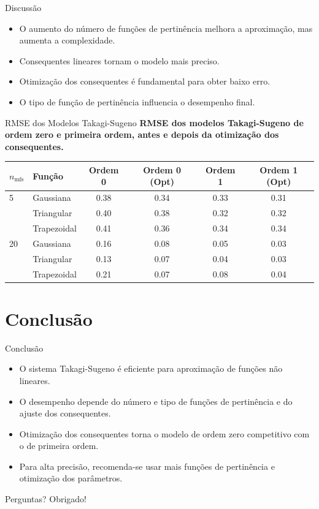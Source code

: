 \documentclass[aspectratio=169]{beamer}
\begin{document}
\begin{frame}{Discussão}
    \begin{itemize}
        \item O aumento do número de funções de pertinência melhora a aproximação, mas aumenta a complexidade.
        \item Consequentes lineares tornam o modelo mais preciso.
        \item Otimização dos consequentes é fundamental para obter baixo erro.
        \item O tipo de função de pertinência influencia o desempenho final.
    \end{itemize}
\end{frame}

\begin{frame}{RMSE dos Modelos Takagi-Sugeno}
    \centering
    \scriptsize
    \textbf{RMSE dos modelos Takagi-Sugeno de ordem zero e primeira ordem, antes e depois da otimização dos consequentes.}
    \vspace{0.5em}
    \begin{tabular}{llcccc}
        \toprule
        $n_\text{mfs}$ & Função & Ordem 0 & Ordem 0 (Opt) & Ordem 1 & Ordem 1 (Opt) \\
        \midrule
        5  & Gaussiana   & 0.38 & 0.34 & 0.33 & 0.31 \\
           & Triangular  & 0.40 & 0.38 & 0.32 & 0.32 \\
           & Trapezoidal & 0.41 & 0.36 & 0.34 & 0.34 \\
        \midrule
        20 & Gaussiana   & 0.16 & 0.08 & 0.05 & 0.03 \\
           & Triangular  & 0.13 & 0.07 & 0.04 & 0.03 \\
           & Trapezoidal & 0.21 & 0.07 & 0.08 & 0.04 \\
        \bottomrule
    \end{tabular}
\end{frame}

\section{Conclusão}

\begin{frame}{Conclusão}
    \begin{itemize}
        \item O sistema Takagi-Sugeno é eficiente para aproximação de funções não lineares.
        \item O desempenho depende do número e tipo de funções de pertinência e do ajuste dos consequentes.
        \item Otimização dos consequentes torna o modelo de ordem zero competitivo com o de primeira ordem.
        \item Para alta precisão, recomenda-se usar mais funções de pertinência e otimização dos parâmetros.
    \end{itemize}
\end{frame}

\begin{frame}{Perguntas?}
    \centering
    \Huge Obrigado!
\end{frame}
\end{document}
